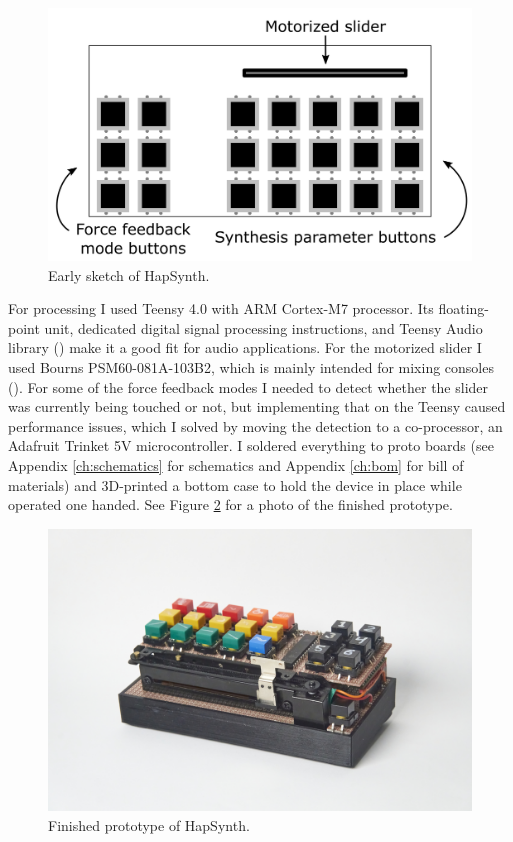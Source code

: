 \begin{figure}[h!]
	\centering
	\includegraphics[width=1.0\linewidth]{figures/Adaptive.png}
	\caption{Early sketch of HapSynth.}
	\label{sketch}
\end{figure}

For processing I used Teensy 4.0 with ARM Cortex-M7 processor. Its floating-point unit, dedicated digital signal processing instructions, and Teensy Audio library (\cite{pjrc2023}) make it a good fit for audio applications. For the motorized slider I used Bourns PSM60-081A-103B2, which is mainly intended for mixing consoles (\cite{bourns2020}). For some of the force feedback modes I needed to detect whether the slider was currently being touched or not, but implementing that on the Teensy caused performance issues, which I solved by moving the detection to a co-processor, an Adafruit Trinket 5V microcontroller. I soldered everything to proto boards (see Appendix \ref{ch:schematics} for schematics and Appendix \ref{ch:bom} for bill of materials) and 3D-printed a bottom case to hold the device in place while operated one handed. See Figure \ref{proto} for a photo of the finished prototype.

\begin{figure}[h]
	\centering
	\includegraphics[width=1.0\linewidth]{figures/HapSynth.jpg}
	\caption{Finished prototype of HapSynth.}
	\label{proto}
\end{figure}

